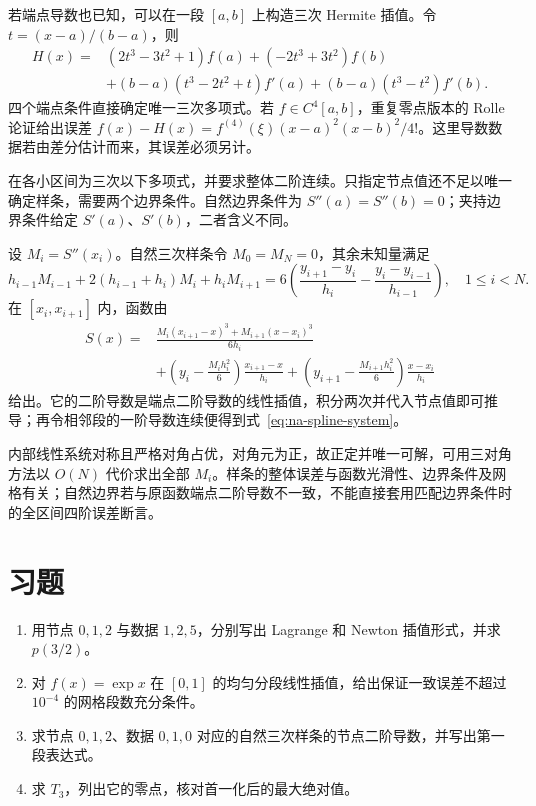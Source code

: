 \documentclass[UTF8,12pt,a4paper,fontset=fandol]{ctexbook}
\begin{document}
若端点导数也已知，可以在一段 $[a,b]$ 上构造三次 Hermite 插值。令 $t=(x-a)/(b-a)$，则
\begin{align*}
 H(x)={}&(2t^3-3t^2+1)f(a)+(-2t^3+3t^2)f(b)\\
 &+(b-a)(t^3-2t^2+t)f'(a)+(b-a)(t^3-t^2)f'(b).
\end{align*}
四个端点条件直接确定唯一三次多项式。若 $f\in C^4[a,b]$，重复零点版本的 Rolle 论证给出误差 $f(x)-H(x)=f^{(4)}(\xi)(x-a)^2(x-b)^2/4!$。这里导数数据若由差分估计而来，其误差必须另计。

在各小区间为三次以下多项式，并要求整体二阶连续。只指定节点值还不足以唯一确定样条，需要两个边界条件。自然边界条件为 $S''(a)=S''(b)=0$；夹持边界条件给定 $S'(a)$、$S'(b)$，二者含义不同。

设 $M_i=S''(x_i)$。自然三次样条令 $M_0=M_N=0$，其余未知量满足
\begin{equation}
 h_{i-1}M_{i-1}+2(h_{i-1}+h_i)M_i+h_iM_{i+1}
 =6\left(\frac{y_{i+1}-y_i}{h_i}-\frac{y_i-y_{i-1}}{h_{i-1}}\right),
 \quad 1\le i<N.
 \label{eq:na-spline-system}
\end{equation}
在 $[x_i,x_{i+1}]$ 内，函数由
\begin{align*}
 S(x)={}&\frac{M_i(x_{i+1}-x)^3+M_{i+1}(x-x_i)^3}{6h_i}\\
 &+\left(y_i-\frac{M_ih_i^2}{6}\right)\frac{x_{i+1}-x}{h_i}
 +\left(y_{i+1}-\frac{M_{i+1}h_i^2}{6}\right)\frac{x-x_i}{h_i}
\end{align*}
给出。它的二阶导数是端点二阶导数的线性插值，积分两次并代入节点值即可推导；再令相邻段的一阶导数连续便得到式~\eqref{eq:na-spline-system}。

内部线性系统对称且严格对角占优，对角元为正，故正定并唯一可解，可用三对角方法以 $O(N)$ 代价求出全部 $M_i$。样条的整体误差与函数光滑性、边界条件及网格有关；自然边界若与原函数端点二阶导数不一致，不能直接套用匹配边界条件时的全区间四阶误差断言。

\section{习题}
\begin{enumerate}[label=\arabic*.]
\item\label{exr:na-interp-poly} 用节点 $0,1,2$ 与数据 $1,2,5$，分别写出 Lagrange 和 Newton 插值形式，并求 $p(3/2)$。
\item\label{exr:na-interp-error} 对 $f(x)=\exp x$ 在 $[0,1]$ 的均匀分段线性插值，给出保证一致误差不超过 $10^{-4}$ 的网格段数充分条件。
\item\label{exr:na-interp-spline} 求节点 $0,1,2$、数据 $0,1,0$ 对应的自然三次样条的节点二阶导数，并写出第一段表达式。
\item\label{exr:na-interp-cheb} 求 $T_3$，列出它的零点，核对首一化后的最大绝对值。
\end{enumerate}
\end{document}
